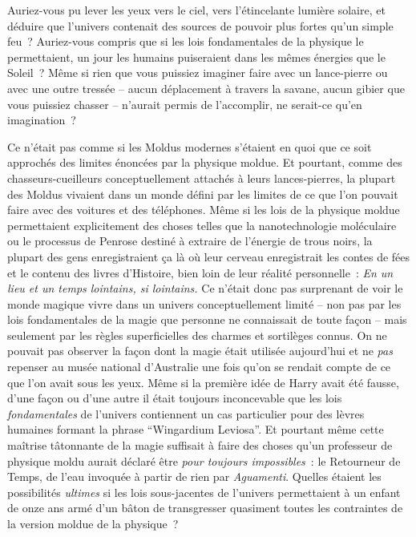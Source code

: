 Auriez-vous pu lever les yeux vers le ciel, vers l'étincelante lumière solaire, et déduire que l'univers contenait des sources de pouvoir plus fortes qu'un simple feu~? Auriez-vous compris que si les lois fondamentales de la physique le permettaient, un jour les humains puiseraient dans les mêmes énergies que le Soleil~? Même si rien que vous puissiez imaginer faire avec un lance-pierre ou avec une outre tressée -- aucun déplacement à travers la savane, aucun gibier que vous puissiez chasser -- n'aurait permis de l'accomplir, ne serait-ce qu'en imagination~?

Ce n'était pas comme si les Moldus modernes s'étaient en quoi que ce soit approchés des limites énoncées par la physique moldue. Et pourtant, comme des chasseurs-cueilleurs conceptuellement attachés à leurs lances-pierres, la plupart des Moldus vivaient dans un monde défini par les limites de ce que l'on pouvait faire avec des voitures et des téléphones. Même si les lois de la physique moldue permettaient explicitement des choses telles que la nanotechnologie moléculaire ou le processus de Penrose destiné à extraire de l'énergie de trous noirs, la plupart des gens enregistraient ça là où leur cerveau enregistrait les contes de fées et le contenu des livres d'Histoire, bien loin de leur réalité personnelle~: \emph{En un lieu et un temps lointains, si lointains.} Ce n'était donc pas surprenant de voir le monde magique vivre dans un univers conceptuellement limité -- non pas par les lois fondamentales de la magie que personne ne connaissait de toute façon -- mais seulement par les règles superficielles des charmes et sortilèges connus. On ne pouvait pas observer la façon dont la magie était utilisée aujourd'hui et ne \emph{pas} repenser au musée national d'Australie une fois qu'on se rendait compte de ce que l'on avait sous les yeux. Même si la première idée de Harry avait été fausse, d'une façon ou d'une autre il était toujours inconcevable que les lois \emph{fondamentales} de l'univers contiennent un cas particulier pour des lèvres humaines formant la phrase “Wingardium Leviosa”. Et pourtant même cette maîtrise tâtonnante de la magie suffisait à faire des choses qu'un professeur de physique moldu aurait déclaré être \emph{pour toujours impossibles}~: le Retourneur de Temps, de l'eau invoquée à partir de rien par \emph{Aguamenti}. Quelles étaient les possibilités \emph{ultimes} si les lois sous-jacentes de l'univers permettaient à un enfant de onze ans armé d'un bâton de transgresser quasiment toutes les contraintes de la version moldue de la physique~?

